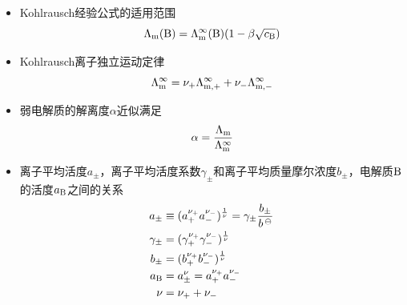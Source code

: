 \documentclass[9pt]{beamer}
\newcommand\B{{\rm B}}
\newcommand\m{{\rm m}}
\begin{document}
	\begin{frame}
	
	\begin{itemize}
	
	\item Kohlrausch经验公式的适用范围
	\[
		\Lambda_\m(\B) = \Lambda^\infty_\m(\B) ( 1 - \beta \sqrt{c_\B} )
	\]
	
	\item  Kohlrausch离子独立运动定律
	\[
		\Lambda^\infty_\m = \nu_+ \Lambda^\infty_{\m,+} + \nu_- \Lambda^\infty_{\m,-}
	\]
	
	\item 弱电解质的解离度$\alpha$近似满足
	\[
		\alpha = \frac{ \Lambda_\m }{ \Lambda^\infty_\m }
	\]
	
	\item 离子平均活度$a_\pm$，离子平均活度系数$\gamma_\pm$和离子平均质量摩尔浓度$b_\pm$，电解质$\B$的活度$a_\B$之间的关系
	\begin{align*}
		a_\pm &\equiv ( a^{\nu_+}_+ a^{\nu_-}_- )^{\frac{1}{\nu}} = \gamma_\pm \frac{ b_\pm }{ b^{\,\ominus} } \\
		\gamma_\pm &= ( \gamma^{\nu_+}_+ \gamma^{\nu_-}_- )^{\frac{1}{\nu}} \\
		b_\pm &= ( b^{\nu_+}_+ b^{\nu_-}_- )^{\frac{1}{\nu}} \\
		a_\B &= a^\nu_\pm = a^{\nu_+}_+ a^{\nu_-}_- \\
		\nu &= \nu_+ + \nu_-
	\end{align*}
	
	\end{itemize}		
	
	\end{frame}
	
\end{document}
